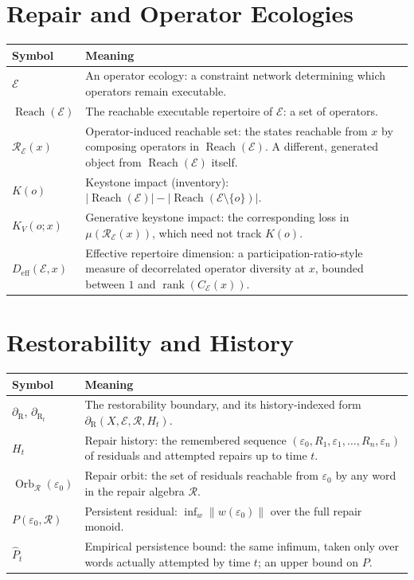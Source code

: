 \documentclass[12pt]{report}
\newcommand{\Reach}{\ensuremath{\operatorname{Reach}}}
\newcommand{\Rboundary}[1][]{\ensuremath{\partial_{\mathrm{R}#1}}}
\begin{document}
\section*{Repair and Operator Ecologies}

\begin{center}
\begin{tabular}{lp{4.6in}}
\hline
Symbol & Meaning \\
\hline
$\mathcal{E}$ & An operator ecology: a constraint network determining
which operators remain executable. \\
$\Reach(\mathcal{E})$ & The reachable executable repertoire of
$\mathcal{E}$: a set of operators. \\
$\mathcal{R}_\mathcal{E}(x)$ & Operator-induced reachable set: the states
reachable from $x$ by composing operators in $\Reach(\mathcal{E})$. A
different, generated object from $\Reach(\mathcal{E})$ itself. \\
$K(o)$ & Keystone impact (inventory): $|\Reach(\mathcal{E})| -
|\Reach(\mathcal{E}\setminus\{o\})|$. \\
$K_V(o;x)$ & Generative keystone impact: the corresponding loss in
$\mu(\mathcal{R}_\mathcal{E}(x))$, which need not track $K(o)$. \\
$D_{\mathrm{eff}}(\mathcal{E},x)$ & Effective repertoire dimension: a
participation-ratio-style measure of decorrelated operator diversity at
$x$, bounded between $1$ and $\operatorname{rank}(C_\mathcal{E}(x))$. \\
\hline
\end{tabular}
\end{center}

\section*{Restorability and History}

\begin{center}
\begin{tabular}{lp{4.6in}}
\hline
Symbol & Meaning \\
\hline
$\Rboundary$, $\Rboundary[_t]$ & The restorability boundary, and its
history-indexed form $\Rboundary(X,\mathcal{E},\mathcal{R},H_t)$. \\
$H_t$ & Repair history: the remembered sequence $(\varepsilon_0, R_1,
\varepsilon_1, \ldots, R_n, \varepsilon_n)$ of residuals and attempted
repairs up to time $t$. \\
$\operatorname{Orb}_\mathcal{R}(\varepsilon_0)$ & Repair orbit: the set
of residuals reachable from $\varepsilon_0$ by any word in the repair
algebra $\mathcal{R}$. \\
$P(\varepsilon_0,\mathcal{R})$ & Persistent residual: $\inf_{w}
\|w(\varepsilon_0)\|$ over the full repair monoid. \\
$\widehat{P}_t$ & Empirical persistence bound: the same infimum, taken
only over words actually attempted by time $t$; an upper bound on $P$. \\
\hline
\end{tabular}
\end{center}
\end{document}
